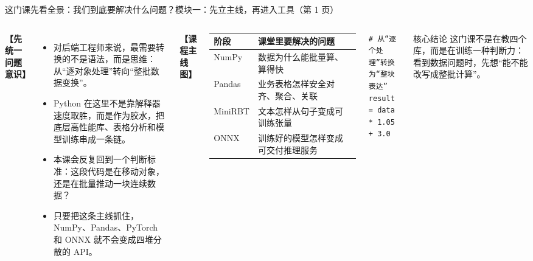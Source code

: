 \documentclass[aspectratio=169,9pt]{beamer}
\begin{document}
\begin{frame}[fragile]{这门课先看全景：我们到底要解决什么问题？}{模块一：先立主线，再进入工具（第 1 页）}
\begin{columns}[T]
    \textbf{【先统一问题意识】}
    \begin{itemize}
        \item 对后端工程师来说，最需要转换的不是语法，而是思维：从“逐对象处理”转向“整批数据变换”。
        \item Python 在这里不是靠解释器速度取胜，而是作为胶水，把底层高性能库、表格分析和模型训练串成一条链。
        \item 本课会反复回到一个判断标准：这段代码是在移动对象，还是在批量推动一块连续数据？
        \item 只要把这条主线抓住，NumPy、Pandas、PyTorch 和 ONNX 就不会变成四堆分散的 API。
    \end{itemize}

    \textbf{【课程主线图】}
    \tiny
    \begin{tabular}{p{1.2cm}p{3.0cm}}
        \toprule
        \textbf{阶段} & \textbf{课堂里要解决的问题} \\
        \midrule
        NumPy & 数据为什么能批量算、算得快 \\
        Pandas & 业务表格怎样安全对齐、聚合、关联 \\
        MiniRBT & 文本怎样从句子变成可训练张量 \\
        ONNX & 训练好的模型怎样变成可交付推理服务 \\
        \bottomrule
    \end{tabular}
    \vspace{2mm}
\begin{lstlisting}
# 从“逐个处理”转换为“整块表达”
result = data * 1.05 + 3.0
\end{lstlisting}
    \begin{alertblock}{核心结论}
        \scriptsize 这门课不是在教四个库，而是在训练一种判断力：看到数据问题时，先想“能不能改写成整批计算”。
    \end{alertblock}
\end{columns}
\end{frame}
\end{document}
